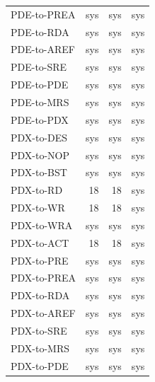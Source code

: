 {\begin{longtable}{@{}l r r r@{}}
PDE-to-PREA & sys & sys & sys\\
PDE-to-RDA & sys & sys & sys\\
PDE-to-AREF & sys & sys & sys\\
PDE-to-SRE & sys & sys & sys\\
PDE-to-PDE & sys & sys & sys\\
PDE-to-MRS & sys & sys & sys\\
PDE-to-PDX & sys & sys & sys\\
PDX-to-DES & sys & sys & sys\\
PDX-to-NOP & sys & sys & sys\\
PDX-to-BST & sys & sys & sys\\
PDX-to-RD & 18 & 18 & sys\\
PDX-to-WR & 18 & 18 & sys\\
PDX-to-WRA & sys & sys & sys\\
PDX-to-ACT & 18 & 18 & sys\\
PDX-to-PRE & sys & sys & sys\\
PDX-to-PREA & sys & sys & sys\\
PDX-to-RDA & sys & sys & sys\\
PDX-to-AREF & sys & sys & sys\\
PDX-to-SRE & sys & sys & sys\\
PDX-to-MRS & sys & sys & sys\\
PDX-to-PDE & sys & sys & sys\\
\bottomrule\end{longtable}}
